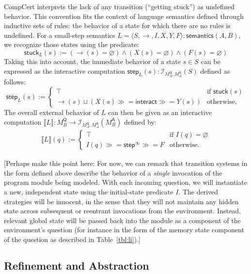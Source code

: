 \documentclass[acmsmall,timestamp,review]{acmart}
\newcommand{\kw}[1]{\ensuremath{ \mathsf{#1} }}
\newcommand{\bind}{\gg\!\!=}
\begin{document}
CompCert interprets the lack of any transition (``getting stuck'')
as undefined behavior.
This convention fits the context of
language semantics defined through inductive sets of rules:
the behavior of a state for which there are no rules is undefined.
For a small-step semantics
$L = \langle S, {\rightarrow}, I, X, Y, F \rangle : \kw{semantics}(A,B)$,
we recognize those states using the predicate:
\[
    \kw{stuck}_L(s) :=
      ({\rightarrow}(s) = \varnothing) \wedge
      (X(s) = \varnothing) \wedge
      (F(s) = \varnothing)
\]
Taking this into account,
the immediate behavior of a state $s \in S$
can be expressed as the interactive computation
$\kw{step}_L(s) : \mathcal{I}_{M_A^\kw{Q},M_A^\kw{A}}(S)$
defined as follows:
\[
  \kw{step}_L(s) :=
    \begin{cases}
      \top & \mbox{if } \kw{stuck}(s) \\
      {\rightarrow}(s) \sqcup
      (X(s) \bind \kw{interact} \bind Y(s)) & \mbox{otherwise,}
   \end{cases}
\]
The overall external behavior of $L$
can then be given as an interactive computation
$
    \llbracket L \rrbracket :
      M_B^\kw{Q} \rightarrow \mathcal{I}_{M_A^\kw{Q},M_A^\kw{A}}(M_B^\kw{A})
$
defined by:
\begin{align*}
  \llbracket L \rrbracket (q) :=
    \begin{cases}
       \top & \mbox{if } I(q) = \varnothing \\
       I(q) \bind \kw{step}^\infty \bind F & \mbox{otherwise.}
     \end{cases}
\end{align*}

[Perhaps make this point here:
For now,
we can remark that transition systems in the form defined above
describe the behavior of a \emph{single} invocation
of the program module being modeled.
With each incoming question,
we will instantiate a new, independent state
using the initial-state predicate $I$.
The derived strategies will be innocent,
in the sense that they will not maintain
any hidden state across subsequent or reentrant
invocations from the environment.
Instead,
relevant global state will be passed back into the module
as a component of the environment's question
(for instance in the form of the memory state component
of the question as described in Table~\ref{tbl:li}).]


\subsection{Refinement and Abstraction} %
\label{sec:modsem:ref}
\end{document}
